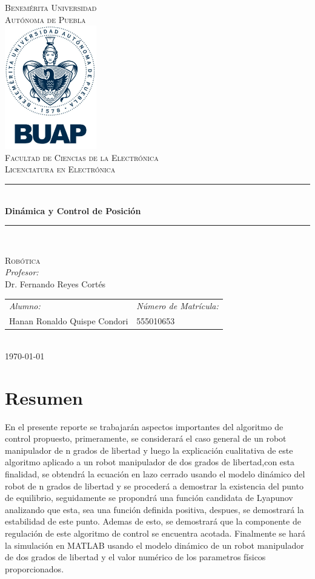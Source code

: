 \documentclass[12pt]{article}
\date{\today}
\begin{document}
\begin{titlepage}
\newcommand{\HRule}{\rule{\linewidth}{0.5mm}} 
\center
\textsc{\LARGE  Benemérita Universidad \\[0.2cm] Autónoma de Puebla}\\[1.5cm] 
\includegraphics[width=4cm]{IMAGENES/escudo}\\[1cm]
\textsc{\Large Facultad de Ciencias de la Electrónica}\\[0.5cm] 
\textsc{\large Licenciatura en Electrónica}\\[0.5cm]
\HRule \\[0.4cm]
{ \huge \bfseries Dinámica y Control de Posición}\\[0.4cm] 
\HRule \\[1.5cm]
\begin{minipage}{\textwidth}
\center 
\textsc{\LARGE Robótica}\\[1.7cm] 
\emph{Profesor:} \\
Dr. Fernando Reyes Cortés \\[1cm]
\begin{tabular}{ll}
\emph{Alumno:} & \emph{Número de Matrícula:}\\
Hanan Ronaldo Quispe Condori  & 555010653\\
\end{tabular}
\end{minipage}\\[2cm]
\today
\end{titlepage}

\newpage
\section{Resumen}
En el presente reporte se trabajarán aspectos importantes del algoritmo de control propuesto, primeramente, se considerará el caso general de un robot manipulador de n grados de libertad y luego la explicación cualitativa de este algoritmo aplicado a un robot manipulador de dos grados de libertad,con esta finalidad, se obtendrá la ecuación en lazo cerrado usando el modelo dinámico del robot de n grados de libertad y se procederá a demostrar la existencia del punto de equilibrio, seguidamente se propondrá una función candidata de Lyapunov analizando que esta, sea una función definida positiva, despues, se demostrará la estabilidad de este punto. Ademas de esto, se demostrará que la componente de regulación de este algoritmo de control se encuentra acotada. Finalmente se hará la simulación en MATLAB usando el modelo dinámico de un robot manipulador de dos grados de libertad y el valor numérico de los parametros físicos proporcionados.
\newpage
\end{document}
